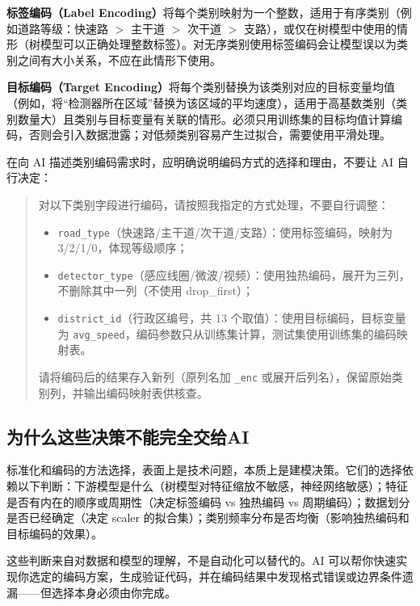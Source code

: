 \textbf{标签编码（Label Encoding）}将每个类别映射为一个整数，适用于有序类别（例如道路等级：快速路 $>$ 主干道 $>$ 次干道 $>$ 支路），或仅在树模型中使用的情形（树模型可以正确处理整数标签）。对无序类别使用标签编码会让模型误以为类别之间有大小关系，不应在此情形下使用。

\textbf{目标编码（Target Encoding）}将每个类别替换为该类别对应的目标变量均值（例如，将“检测器所在区域”替换为该区域的平均速度），适用于高基数类别（类别数量大）且类别与目标变量有关联的情形。必须只用训练集的目标均值计算编码，否则会引入数据泄露；对低频类别容易产生过拟合，需要使用平滑处理。

在向 AI 描述类别编码需求时，应明确说明编码方式的选择和理由，不要让 AI 自行决定：

\begin{quote}
对以下类别字段进行编码，请按照我指定的方式处理，不要自行调整：

\begin{itemize}
  \item \texttt{road\_type}（快速路/主干道/次干道/支路）：使用标签编码，映射为 3/2/1/0，体现等级顺序；
  \item \texttt{detector\_type}（感应线圈/微波/视频）：使用独热编码，展开为三列，不删除其中一列（不使用 drop\_first）；
  \item \texttt{district\_id}（行政区编号，共 13 个取值）：使用目标编码，目标变量为 \texttt{avg\_speed}，编码参数只从训练集计算，测试集使用训练集的编码映射表。
\end{itemize}

请将编码后的结果存入新列（原列名加 \texttt{\_enc} 或展开后列名），保留原始类别列，并输出编码映射表供核查。
\end{quote}

\subsection{为什么这些决策不能完全交给AI}

标准化和编码的方法选择，表面上是技术问题，本质上是建模决策。它们的选择依赖以下判断：下游模型是什么（树模型对特征缩放不敏感，神经网络敏感）；特征是否有内在的顺序或周期性（决定标签编码 vs 独热编码 vs 周期编码）；数据划分是否已经确定（决定 scaler 的拟合集）；类别频率分布是否均衡（影响独热编码和目标编码的效果）。

这些判断来自对数据和模型的理解，不是自动化可以替代的。AI 可以帮你快速实现你选定的编码方案，生成验证代码，并在编码结果中发现格式错误或边界条件遗漏——但选择本身必须由你完成。

